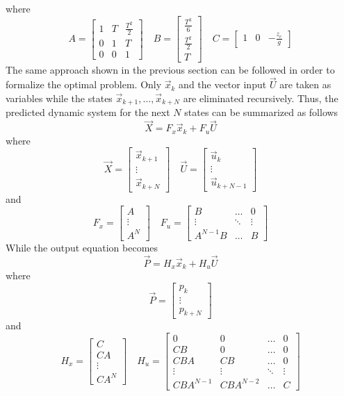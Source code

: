 where
\[
A = \begin{bmatrix}
  1 & T & \frac{T^2}{2}\\
  0 & 1 & T \\
  0 & 0 & 1
\end{bmatrix} \quad
B = \begin{bmatrix}
  \frac{T^3}{6}\\
  \frac{T^2}{2}\\
  T
\end{bmatrix}\quad
C =  \begin{bmatrix}
    1 & 0 & -\frac{z_c}{g}
  \end{bmatrix}
\]
The same approach shown in the previous section can be followed in order to formalize the optimal
problem.
Only $\vec{x}_k$ and the vector input $\vec{U}$ are taken as variables while the states $\vec{x}_{k + 1}, \dots, \vec{x}_{k + N}$ are eliminated recursively.
Thus, the predicted dynamic system for the next $N$ states can be summarized as follows
\[
\vec{X} = F_{x} \vec{x}_k + F_{u} \vec{U}
\]
where
\[
\vec{X} =
\begin{bmatrix}
  \vec{x}_{k+1}\\
  \vdots\\
  \vec{x}_{k+N}
\end{bmatrix} \quad
\vec{U} =
\begin{bmatrix}
  \vec{u}_{k}\\
  \vdots\\
  \vec{u}_{k+N-1}
\end{bmatrix}
\]
and
\[
F_{x} =
\begin{bmatrix}
  A\\
  \vdots\\
  A^N
\end{bmatrix} \quad
F_u =
\begin{bmatrix}
  B & \hdots & 0\\
  \vdots &\ddots & \vdots\\
  A^{N-1} B & \hdots & B
\end{bmatrix}
\]
While the output equation becomes
\[
\vec{P} = H_{x} \vec{x}_k + H_{u} \vec{U}
\]
where
\[
\vec{P} =
\begin{bmatrix}
  p_{k}\\
  \vdots\\
  p_{k+N}
\end{bmatrix}
\]
and
\[
H_{x} =
\begin{bmatrix}
  C \\
  CA \\
  \vdots\\
  C A^{N}
\end{bmatrix} \quad
H_u =
\begin{bmatrix}
  0 & 0 & \hdots & 0\\
  CB & 0 & \hdots &  0 \\
  CBA & CB & \hdots &  0 \\
  \vdots & \vdots & \ddots & \vdots \\ 
    CBA^{N-1} & CBA^{N-2} & \hdots &  C 
\end{bmatrix}
\]

